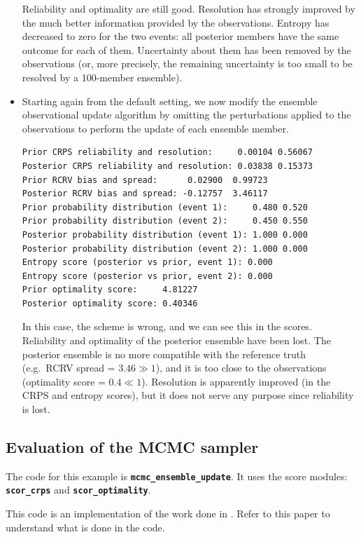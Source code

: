 \documentclass[11pt]{article}
\begin{document}
\begin{itemize}
Reliability and optimality are still good.
Resolution has strongly improved
by the much better information provided by the observations.
Entropy has decreased to zero for the two events:
all posterior members have the same outcome for each of them.
Uncertainty about them has been removed by the observations
(or, more precisely, the remaining uncertainty is too small
to be resolved by a 100-member ensemble).

\item
Starting again from the default setting,
we now modify the ensemble observational update algorithm
by omitting the perturbations applied to the observations
to perform the update of each ensemble member.

\begin{verbatim}
Prior CRPS reliability and resolution:     0.00104 0.56067
Posterior CRPS reliability and resolution: 0.03838 0.15373
Prior RCRV bias and spread:      0.02900  0.99723
Posterior RCRV bias and spread: -0.12757  3.46117
Prior probability distribution (event 1):     0.480 0.520
Prior probability distribution (event 2):     0.450 0.550
Posterior probability distribution (event 1): 1.000 0.000
Posterior probability distribution (event 2): 1.000 0.000
Entropy score (posterior vs prior, event 1): 0.000
Entropy score (posterior vs prior, event 2): 0.000
Prior optimality score:     4.81227
Posterior optimality score: 0.40346
\end{verbatim}

In this case, the scheme is wrong, and we can see this in the scores.
Reliability and optimality of the posterior ensemble have been lost.
The posterior ensemble is no more compatible with the reference truth
(e.g.~RCRV spread = $3.46 \gg 1$), and it is too close
to the observations (optimality score = $0.4 \ll 1$).
Resolution is apparently improved (in the CRPS and entropy scores),
but it does not serve any purpose since reliability is lost.

\end{itemize}

\subsection{Evaluation of the MCMC sampler}

The code for this example is {\tt\bf mcmc\_ensemble\_update}.
It uses the score modules: {\tt\bf scor\_crps} and {\tt\bf scor\_optimality}.

This code is an implementation of the work done in \citet{BRAN19}.
Refer to this paper to understand what is done in the code.
\end{document}
